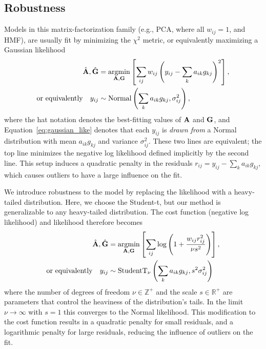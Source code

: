 \documentclass[onecolumn,floatfix,linenumbers,trackchanges]{aastex631}
\DeclareMathOperator*{\argmin}{argmin}
\begin{document}
\subsection{Robustness}

Models in this matrix-factorization family (e.g., PCA, where all $w_{ij} = 1$, and HMF), are usually fit by minimizing the $\chi^2$ metric, or equivalently maximizing a Gaussian likelihood
\begin{align}
    \hat{\bf A}, \hat{\bf G} &= \argmin_{{\bf A},{\bf G}} \left[\sum_{ij} w_{ij}\left(y_{ij} - \sum_k a_{ik} g_{kj} \right)^2\right], \\
    {\rm or \,\, equivalently} \quad y_{ij} &\sim {\rm Normal} \left( \sum_k a_{ik} g_{kj}, \sigma^2_{ij}\right), \label{eq:gaussian_like}
\end{align}
where the hat notation denotes the best-fitting values of ${\bf A}$ and ${\bf G}$, and Equation~\ref{eq:gaussian_like} denotes that each $y_{ij}$ is \emph{drawn from} a Normal distribution with mean $a_{ik} g_{kj}$ and variance $\sigma_{ij}^2$.
These two lines are equivalent; the top line minimizes the negative log likelihood defined implicitly by the second line.
This setup induces a quadratic penalty in the residuals $r_{ij} = y_{ij} - \sum_k a_{ik}g_{kj}$, which causes outliers to have a large influence on the fit.


We introduce robustness to the model by replacing the likelihood with a heavy-tailed distribution.
Here, we choose the Student-t, but our method is generalizable to any heavy-tailed distribution.
The cost function (negative log likelihood) and likelihood therefore becomes
\begin{align}
    \hat{\bf A}, \hat{\bf G} &= \argmin_{\bf A, G} \left[ \sum_{ij} \log\left(1 + \frac{w_{ij} r_{ij}^2}{\nu s^2}\right) \right], \label{eq:robust_opt} \\
    {\rm or \,\, equivalently} \quad y_{ij} &\sim {\rm StudentT}_\nu \left( \sum_k a_{ik} g_{kj}, s^2 \sigma_{ij}^2 \right) \label{eq:t_like}
\end{align}
where the number of degrees of freedom $\nu\in\mathbb{Z}^+$ and the scale $s\in\mathbb{R}^+$ are parameters that control the heaviness of the distribution's tails.
In the limit $\nu \rightarrow \infty$ with $s=1$ this converges to the Normal likelihood.
This modification to the cost function results in a quadratic penalty for small residuals, and a logarithmic penalty for large residuals, reducing the influence of outliers on the fit.
\end{document}
